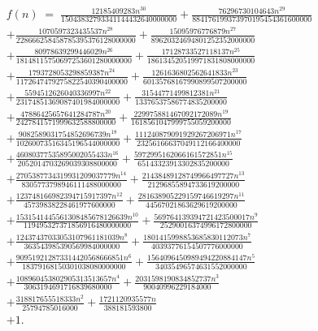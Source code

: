 \documentclass[11pt,a4paper]{article}
\theoremstyle{plain}
\theoremstyle{definition}
\begin{document}
\begin{multline*}
f(n)\;=\;\frac{12185409283 n^{30}}{15043832793341144432640000000} + \frac{76296730104643 n^{29}}{884176199373970195454361600000} \\
+ \frac{1070597323435537 n^{28}}{228666258458785395376128000000} + \frac{15095976776879 n^{27}}{89620324694801252352000000} \\
+ \frac{80978639299446029 n^{26}}{18148115750697253601280000000} + \frac{17128733527118137 n^{25}}{186134520519971831808000000} \\
+ \frac{1793728053298859387 n^{24}}{1172647479275822540390400000} + \frac{1261636802562641833 n^{23}}{60135768167990899507200000} \\
+ \frac{5594512626040336997 n^{22}}{23174851369087401984000000} + \frac{31544771499812381 n^{21}}{13376537586774835200000} \\
+ \frac{47886425657641284787 n^{20}}{2427841571999632588800000} + \frac{229975881467092172089 n^{19}}{1618561047999755059200000} \\
+ \frac{9082589031754852696739 n^{18}}{10260073516345196544000000} + \frac{111240879091929267206971 n^{17}}{23256166637049112166400000} \\
+ \frac{46080377535895002055433 n^{16}}{2052014703269039308800000} + \frac{5972995162066161572851 n^{15}}{65143323913302835200000} \\
+ \frac{2705387734319931209037779 n^{14}}{8305773798946111488000000} + \frac{21438489128749966497727 n^{13}}{21296855894733619200000} \\
+ \frac{123748166982394715917397 n^{12}}{45739838228461977600000} + \frac{281638905229159746619297 n^{11}}{44567021863629619200000} \\
+ \frac{1531541445561308485678126639 n^{10}}{119495327371856916480000000} + \frac{569764139394721423500017 n^{9}}{25290016374996172800000} \\
+ \frac{12437437033053107961181039 n^{8}}{363543985390569984000000} + \frac{1801415998853685830112073 n^{7}}{40393776154507776000000} \\
+ \frac{909519212873314420568666851 n^{6}}{18379168150301038080000000} + \frac{1564096450989494220884147 n^{5}}{34035496574631552000000} \\
+ \frac{108960453802905313513657 n^{4}}{3063194691716839680000} + \frac{2031598190834852737 n^{3}}{90040996229184000} \\
+ \frac{318817655518333 n^{2}}{25794785016000} + \frac{1721120935577 n}{388181593800} \\
+ 1.
\end{multline*}
\end{document}

